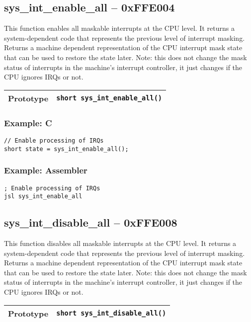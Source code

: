 \subsection*{sys\_int\_enable\_all -- 0xFFE004}
This function enables all maskable interrupts at the CPU level. It returns a system-dependent code that represents the previous level of interrupt masking.
Returns a machine dependent representation of the CPU interrupt mask state that can be used to restore the state later.
Note: this does not change the mask status of interrupts in the machine's interrupt controller, it just changes if the CPU ignores IRQs or not.

\bigskip

\begin{tabular}{|l||l|} \hline
Prototype & \lstinline!short sys_int_enable_all()! \\ \hline
\end{tabular}

\subsubsection*{Example: C}
\begin{lstlisting}
// Enable processing of IRQs
short state = sys_int_enable_all();
\end{lstlisting}

\subsubsection*{Example: Assembler}
\begin{verbatim}
; Enable processing of IRQs
jsl sys_int_enable_all
\end{verbatim}

\subsection*{sys\_int\_disable\_all -- 0xFFE008}
This function disables all maskable interrupts at the CPU level. It returns a system-dependent code that represents the previous level of interrupt masking. 
Returns a machine dependent representation of the CPU interrupt mask state that can be used to restore the state later.
Note: this does not change the mask status of interrupts in the machine's interrupt controller, it just changes if the CPU ignores IRQs or not.

\bigskip

\begin{tabular}{|l||l|} \hline
Prototype & \lstinline!short sys_int_disable_all()! \\ \hline
\end{tabular}

